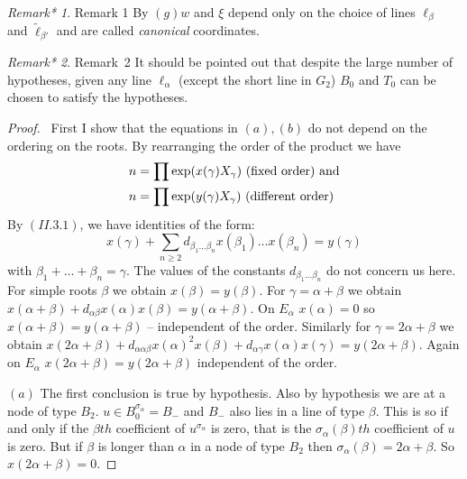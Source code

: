 \documentclass{memo-l}
\theoremstyle{definition}
\theoremstyle{remark}
\newtheorem{remark*}{Remark*} %
\numberwithin{section}{chapter}
\numberwithin{equation}{chapter}
\begin{document}
\begin{remark*}{Remark  1} By $(g) w$ and ${\xi}$ depend only on the choice of
lines ${\ell}_{{\beta}}$ and $\tilde{\ell} _{{\beta}'}$ and are called
{\it canonical} coordinates.
\end{remark*}

\begin{remark*}{Remark\ 2} It should be pointed out that despite the large
number of hypotheses, given any line ${\ell}_{{\alpha}}$ (except the short
line in $G_{2}$) $B_{0}$ and $T_{0}$ can be chosen to satisfy the hypotheses.
\end{remark*}

\begin{proof} \ First I show that the equations in $(a),(b)$ do not
depend on the ordering on the roots.  By rearranging the order of the
product we have
$$
\aligned
n & = \prod \exp(x({\gamma})X_{{\gamma}})\ {\text{(fixed\ order)\ and}}\\
n & = \prod \exp(y({\gamma})X_{{\gamma}})\ {\text{(different\ order)}}
\endaligned
$$
By $(II.3.1)$, we have identities of the form:
$$
x({\gamma}) + \sum_{n \ge 2} d_{{\beta}_{1}\ldots
{\beta}_{n}} x({\beta}_{1})\ldots x({\beta}_{n}) = y({\gamma})
$$
with ${\beta}_{1}+\ldots +{\beta}_{n} = {\gamma}$.  The values of the
constants $d_{{\beta}_{1}\ldots {\beta}_{n}}$ do not concern us here.
For simple roots ${\beta}$ we obtain $x({\beta}) = y({\beta})$.  For
${\gamma} = {\alpha}+{\beta}$ we obtain $x({\alpha}+{\beta}) +
d_{{\alpha}{\beta}}x({\alpha})x({\beta}) = y({\alpha}+{\beta})$.  On
$E_{{\alpha}}$ $x({\alpha}) = 0$ so $x({\alpha}+{\beta}) =
y({\alpha}+{\beta})$ -- independent of the order.  Similarly for ${\gamma} =
2{\alpha}+{\beta}$ we obtain $x(2{\alpha}+{\beta}) +
d_{{\alpha}{\alpha}{\beta}}x({\alpha})^{2}x({\beta}) +
d_{{\alpha}{\gamma}}x({\alpha})x({\gamma}) = y(2{\alpha}+{\beta})$.  Again
on $E_{{\alpha}}$ $x(2{\alpha}+{\beta}) = y(2{\alpha}+{\beta})$ independent
of the order.

   $(a)$ The first conclusion is true by hypothesis.  Also by hypothesis we
are at a node of type $B_{2}$.  $u  \in  B_{0}^{{\sigma}_{{\alpha}}} = 
B_{-}$ and $B_{-}$ also lies in a line of type ${\beta}$.  This is so if
and only if the ${\beta}th$ coefficient of $u^{{\sigma}_{{\alpha}}}$
is zero, that is the ${\sigma}_{{\alpha}}({\beta})th$ coefficient of $u$ is
zero.  But if ${\beta}$ is longer than ${\alpha}$ in a node of type $B_{2}$
then ${\sigma}_{{\alpha}}({\beta}) = 2{\alpha}+{\beta}$.  So
$x(2{\alpha}+{\beta}) = 0$.


\end{proof}
\end{document}
